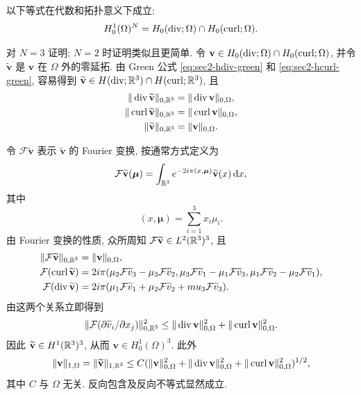 \setcounter{statement}{4}
\begin{Lemma}\label{lem:sec2-h1-hdiv-hcurl}
以下等式在代数和拓扑意义下成立:
\[
  H_0^1(\Omega)^N=H_0(\operatorname{div};\Omega)\cap H_0(\operatorname{curl};\Omega).
\]
\end{Lemma}
\begin{Proof}
对 $N=3$ 证明; $N=2$ 时证明类似且更简单. 令
$\mathbf v\in H_0(\operatorname{div};\Omega)\cap H_0(\operatorname{curl};\Omega)$, 并令
$\widetilde{\mathbf v}$ 是 $\mathbf v$ 在 $\Omega$ 外的零延拓. 由 Green 公式
\eqref{eq:sec2-hdiv-green} 和 \eqref{eq:sec2-hcurl-green}, 容易得到
$\widetilde{\mathbf v}\in H(\operatorname{div};\mathbb{R}^3)\cap H(\operatorname{curl};\mathbb{R}^3)$, 且
\[
\begin{gathered}
  \|\operatorname{div}\widetilde{\mathbf v}\|_{0,\mathbb{R}^3}=\|\operatorname{div}\mathbf v\|_{0,\Omega},\\
  \|\operatorname{curl}\widetilde{\mathbf v}\|_{0,\mathbb{R}^3}=\|\operatorname{curl}\mathbf v\|_{0,\Omega},\\
  \|\widetilde{\mathbf v}\|_{0,\mathbb{R}^3}=\|\mathbf v\|_{0,\Omega}.
\end{gathered}
\]

令 $\mathcal F\widetilde{\mathbf v}$ 表示 $\widetilde{\mathbf v}$ 的 Fourier 变换, 按通常方式定义为
\begin{equation}\label{eq:sec2-fourier-transform-vector}
  \mathcal F\widetilde{\mathbf v}(\boldsymbol\mu)
  =\int_{\mathbb{R}^3}e^{-2i\pi(x,\boldsymbol\mu)}
  \widetilde{\mathbf v}(x)\,\mathrm{d} x,
\end{equation}
其中
\[
  (x,\boldsymbol\mu)=\sum_{i=1}^{3}x_i\mu_i.
\]
由 Fourier 变换的性质, 众所周知
$\mathcal F\widetilde{\mathbf v}\in L^2(\mathbb{R}^3)^3$, 且
\[
\begin{aligned}
  \|\mathcal F\widetilde{\mathbf v}\|_{0,\mathbb{R}^3}
    &=\|\mathbf v\|_{0,\Omega},\\
  \mathcal F(\operatorname{curl}\widetilde{\mathbf v})
    &=2i\pi(\mu_2\mathcal F\widetilde v_3-\mu_3\mathcal F\widetilde v_2,
      \mu_3\mathcal F\widetilde v_1-\mu_1\mathcal F\widetilde v_3,
      \mu_1\mathcal F\widetilde v_2-\mu_2\mathcal F\widetilde v_1),\\
  \mathcal F(\operatorname{div}\widetilde{\mathbf v})
    &=2i\pi(\mu_1\mathcal F\widetilde v_1+
      \mu_2\mathcal F\widetilde v_2+mu_3\mathcal F\widetilde v_3).
\end{aligned}
\]
由这两个关系立即得到
\[
  \|\mathcal F(\partial\widetilde v_i/\partial x_j)\|_{0,\mathbb{R}^3}^2
  \le\|\operatorname{div}\mathbf v\|_{0,\Omega}^2+
  \|\operatorname{curl}\mathbf v\|_{0,\Omega}^2.
\]
因此 $\widetilde{\mathbf v}\in H^1(\mathbb{R}^3)^3$, 从而
$\mathbf v\in H_0^1(\Omega)^3$. 此外
\[
  \|\mathbf v\|_{1,\Omega}=\|\widetilde{\mathbf v}\|_{1,\mathbb{R}^3}
  \le C(\|\mathbf v\|_{0,\Omega}^2+
  \|\operatorname{div}\mathbf v\|_{0,\Omega}^2+
  \|\operatorname{curl}\mathbf v\|_{0,\Omega}^2)^{1/2},
\]
其中 $C$ 与 $\Omega$ 无关. 反向包含及反向不等式显然成立.
\end{Proof}

